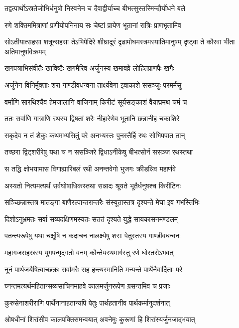 \twolineshloka
{तद्वत्पार्थोऽस्रतेजोभिर्धनुषो निस्वनेन च}
{दैवाद्वीर्याच्च बीभत्सुस्तस्मिन्दौर्योधने बले}


\twolineshloka
{रणे शक्तिममित्राणां प्रणीयोपनिनाय सः}
{चेष्टां प्रायेण भूतानां रात्रिः प्राणभृतामिव}


\threelineshloka
{सोऽतीयात्सहसा शत्रून्सहसा तेऽभिपेदिरे}
{शीघ्रादूरं दृढामोघमस्त्रमस्यातिमानुषम्}
{दृष्ट्वा ते कौरवा भीता अतिमानुषविक्रमम्}


\twolineshloka
{खगपत्राभिसंवीतैः खाविष्टैः खगमैरिव}
{अर्जुनस्य खमावव्रे लोहितप्राणपैः खगैः}


\twolineshloka
{अर्जुनेन विनिर्मुक्ताः शरा गाण्डीवधन्वना}
{तार्क्ष्यवेगा इवाकाशे ससञ्जुः परमर्मसु}


\twolineshloka
{वर्माणि सारथिश्चैव हेमजालानि वाजिनाम्}
{किरीटं सूर्यसङ्काशं वैयाघ्रमथ चर्म च}


\twolineshloka
{ततः सर्वाणि गात्राणि रथस्य द्विषतां शरैः}
{नीहारेणेव भूतानि छन्नानीह चकाशिरे}


\twolineshloka
{सकृदेव न तं शेकुः कथमभ्यसितुं परे}
{अनभ्यस्तः पुनस्तैर्हि रथः सोभिपपात तान्}


\twolineshloka
{तच्छरा द्विट्शरीरेषु यथा च न ससञ्जिरे}
{द्विधाऽनीकेषु बीभत्सोर्न ससञ्ज रथस्तथा}


\twolineshloka
{स तद्धि क्षोभयामास विगाह्यारिबलं रथी}
{अनन्तवेगो भुजगः क्रीडन्निव महार्णवे}


\twolineshloka
{अस्यतो नित्यमत्यर्थं सर्वघोषाधिकस्तथा}
{सन्नादः श्रूयते भूतैर्धनुषश्च किरीटिनः}


\twolineshloka
{सञ्च्छिन्नास्तत्र मातङ्गा बाणैरल्पान्तरान्तरैः}
{संस्यूतास्तत्र दृश्यन्ते मेघा इव गभस्तिभिः}


\twolineshloka
{दिशोऽनुभ्रमतः सर्वा सव्यदक्षिणमस्यतः}
{सततं दृश्यते युद्धे सायकासनमण्डलम्}


\twolineshloka
{पतन्त्यरूपेषु यथा चक्षूंषि न कदाचन}
{नालक्ष्येषु शराः पेतुस्तस्य गाण्डीवधन्वनः}


\twolineshloka
{महागजसहस्रस्य युगपन्मृद्गतो वनम्}
{कौन्तेयरथमार्गस्तु रणे घोरतरोऽभवत्}


\twolineshloka
{नूनं पार्थजयैषित्वाच्छक्रः सर्वामरैः सह}
{हन्त्यस्मानिति मन्यन्ते पार्थेनैवार्दिताः परे}


\twolineshloka
{घ्नन्तमत्यर्थमहितान्सव्यसाचिनमाहवे}
{कालमर्जुनरूपेण ग्रसन्तमिव च प्रजाः}


\twolineshloka
{कुरुसेनाशरीराणि पार्थेनानाहतान्यपि}
{पेतुः पार्थहतानीव पार्थकर्मानुदर्शनात्}


\twolineshloka
{ओषधीनां शिरांसीव कालपक्तिसमन्वयात्}
{अवनेमुः कुरूणां हि शिरांस्यर्जुनजाद्भयात्}


